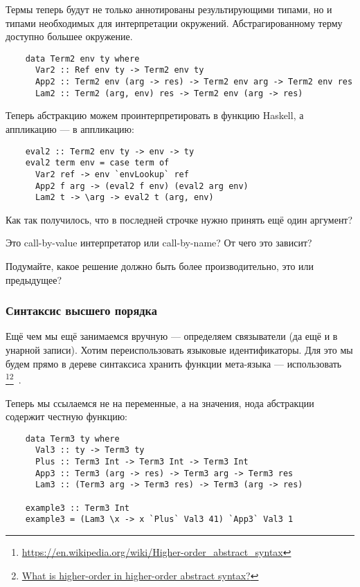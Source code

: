 Термы теперь будут не только аннотированы результирующими типами, но и типами необходимых для интерпретации окружений.
Абстрагированному терму доступно большее окружение.

\begin{verbatim}
    data Term2 env ty where
      Var2 :: Ref env ty -> Term2 env ty
      App2 :: Term2 env (arg -> res) -> Term2 env arg -> Term2 env res
      Lam2 :: Term2 (arg, env) res -> Term2 env (arg -> res)
\end{verbatim}

Теперь абстракцию можем проинтерпретировать в функцию Haskell, а аппликацию --- в аппликацию:
\begin{verbatim}
    eval2 :: Term2 env ty -> env -> ty
    eval2 term env = case term of
      Var2 ref -> env `envLookup` ref
      App2 f arg -> (eval2 f env) (eval2 arg env)
      Lam2 t -> \arg -> eval2 t (arg, env)
\end{verbatim}

\begin{task}
    Как так получилось, что в последней строчке нужно принять ещё один аргумент?
\end{task}

\begin{task}
    Это call-by-value интерпретатор или call-by-name?
    От чего это зависит?
\end{task}

\begin{task}
    Подумайте, какое решение должно быть более производительно, это или предыдущее?
\end{task}

\subsubsection{Синтаксис высшего порядка} \label{subsubsec:h-syntax}

Ещё чем мы ещё занимаемся вручную --- определяем связыватели (да ещё и в унарной записи).
Хотим переиспользовать языковые идентификаторы.
Для это мы будем прямо в дереве синтаксиса хранить функции мета-языка --- использовать \footnote{\url{https://en.wikipedia.org/wiki/Higher-order_abstract_syntax}}\footnote{\href{https://cstheory.stackexchange.com/questions/20071/what-is-higher-order-in-higher-order-abstract-syntax}{What is higher-order in higher-order abstract syntax?}}~\cite{pfenning1988higher}.

Теперь мы ссылаемся не на переменные, а на значения, нода абстракции содержит честную функцию:
\begin{verbatim}
    data Term3 ty where
      Val3 :: ty -> Term3 ty
      Plus :: Term3 Int -> Term3 Int -> Term3 Int
      App3 :: Term3 (arg -> res) -> Term3 arg -> Term3 res
      Lam3 :: (Term3 arg -> Term3 res) -> Term3 (arg -> res)

    example3 :: Term3 Int
    example3 = (Lam3 \x -> x `Plus` Val3 41) `App3` Val3 1
\end{verbatim}

